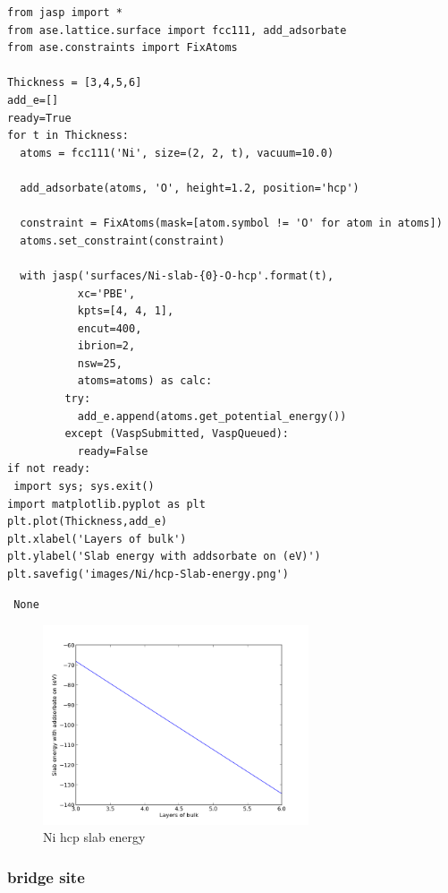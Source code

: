 \documentclass[11pt]{article}
\begin{document}
\begin{verbatim}
from jasp import *
from ase.lattice.surface import fcc111, add_adsorbate
from ase.constraints import FixAtoms

Thickness = [3,4,5,6]
add_e=[]
ready=True
for t in Thickness:
  atoms = fcc111('Ni', size=(2, 2, t), vacuum=10.0)

  add_adsorbate(atoms, 'O', height=1.2, position='hcp')

  constraint = FixAtoms(mask=[atom.symbol != 'O' for atom in atoms])
  atoms.set_constraint(constraint)

  with jasp('surfaces/Ni-slab-{0}-O-hcp'.format(t),
           xc='PBE',
           kpts=[4, 4, 1],
           encut=400,
           ibrion=2,
           nsw=25,
           atoms=atoms) as calc:
         try:
           add_e.append(atoms.get_potential_energy())
         except (VaspSubmitted, VaspQueued):
           ready=False
if not ready:
 import sys; sys.exit()
import matplotlib.pyplot as plt
plt.plot(Thickness,add_e)
plt.xlabel('Layers of bulk')
plt.ylabel('Slab energy with addsorbate on (eV)')
plt.savefig('images/Ni/hcp-Slab-energy.png')
\end{verbatim}

\begin{verbatim}
 None
\end{verbatim}
\begin{figure}[H]
\centering
\includegraphics[width=0.7\textwidth]{./images/Ni/hcp-Slab-energy.png}
\caption{Ni hcp slab energy}
\end{figure}
\subsubsection{bridge site}
\label{sec-3-4-3}
\end{document}
